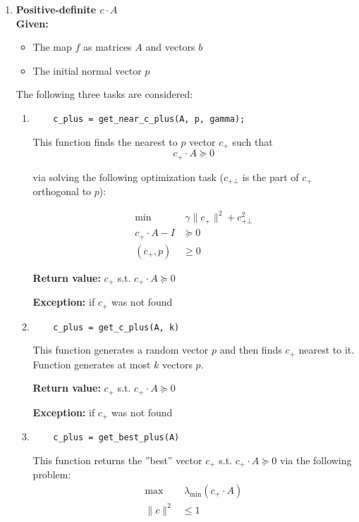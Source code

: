\documentclass[a4paper]{article}
\theoremstyle{definition}
\begin{document}
\begin{enumerate}
\begin{enumerate}
	{\bf Return value:} $1$ if $F$ is nonconvex, $0$ if result is uncertain
\end{enumerate}

\item {\bf Positive-definite $c\cdot A$}\\
{\bf Given:}
\begin{itemize}
	\item The map $f$ as matrices $A$ and vectors $b$
	\item The initial normal vector $p$
\end{itemize}
The following three tasks are considered:
\begin{enumerate}
	\item \begin{verbatim}
	c_plus = get_near_c_plus(A, p, gamma);
	\end{verbatim}

	This function finds the nearest to $p$ vector $c_+$ such that
	$$c_+\cdot A\succeq 0$$
	
	via solving the following optimization task ($c_{+\bot}$ is the part of $c_+$ orthogonal to $p$):

\begin{align}
\min & ~\gamma \|c_+\|^2+c^2_{+\bot} \nonumber\\
c_+\cdot A-I&  \succeq 0 \nonumber\\
(c_+, p) & \geqslant 0 \nonumber
\end{align}

	{\bf Return value:}  $c_+$ s.t. $c_+\cdot A\succeq 0$
	
	{\bf Exception:} if $c_+$ was not found
	
	\item \begin{verbatim}
	c_plus = get_c_plus(A, k)
	\end{verbatim}
	
	This function generates a random vector $p$ and then finds $c_+$ nearest to it. Function generates at most $k$ vectors $p$.
	
	{\bf Return value:} $c_+$ s.t. $c_+\cdot A\succeq 0$
	
	{\bf Exception:} if $c_+$ was not found
	
	\item \begin{verbatim}
	c_plus = get_best_plus(A)
	\end{verbatim}
	
	This function returns the ''best'' vector $c_+$ s.t. $c_+\cdot A\succeq 0$ via the following problem:
\begin{align}
\max & ~\lambda_{\min}(c_+\cdot A) \nonumber\\
\|c\|^2&  \leqslant 1 \nonumber
\end{align}
	

\end{enumerate}
\end{enumerate}
\end{document}
